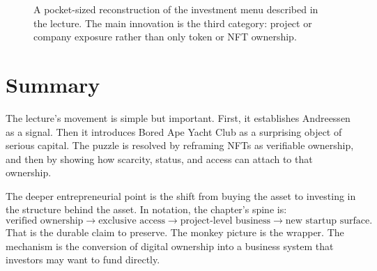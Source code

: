 \begin{figure}
\centering
{}
\caption{A pocket-sized reconstruction of the investment menu described in the lecture. The main innovation is the third category: project or company exposure rather than only token or NFT ownership.}
\end{figure}

\section{Summary}

The lecture's movement is simple but important. First, it establishes Andreessen as a signal. Then it introduces Bored Ape Yacht Club as a surprising object of serious capital. The puzzle is resolved by reframing NFTs as verifiable ownership, and then by showing how scarcity, status, and access can attach to that ownership.

The deeper entrepreneurial point is the shift from buying the asset to investing in the structure behind the asset. In notation, the chapter's spine is:
\begin{equation}
\text{verified ownership}
\longrightarrow
\text{exclusive access}
\longrightarrow
\text{project-level business}
\longrightarrow
\text{new startup surface}.
\end{equation}
That is the durable claim to preserve. The monkey picture is the wrapper. The mechanism is the conversion of digital ownership into a business system that investors may want to fund directly.